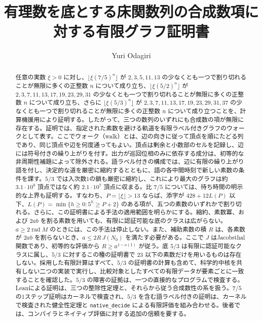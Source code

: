 \documentclass[11pt,reqno]{amsart}
\title[有理数を底とする床関数列の有限グラフ証明書]{有理数を底とする床関数列の合成数項に対する有限グラフ証明書}
\author{Yuri Odagiri}
\date{}
\theoremstyle{definition}
\theoremstyle{definition}
\theoremstyle{remark}
\begin{document}

\begin{abstract}

任意の実数 \(\xi>0\) に対し、\(\lfloor\xi(7/5)^n\rfloor\) が \(2,3,5,11,13\) の少なくとも一つで割り切れることが無限に多くの正整数 \(n\) について成り立ち、\(\lfloor\xi(5/2)^n\rfloor\) が \(2,3,7,11,13,17,19,23,29,31\) の少なくとも一つで割り切れることが無限に多くの正整数 \(n\) について成り立ち、さらに \(\lfloor\xi(5/3)^n\rfloor\) が \(2,3,7,11,13,17,19,23,29,31,37\) の少なくとも一つで割り切れることが無限に多くの正整数 \(n\) について成り立つことを、計算機援用により証明する。したがって、三つの数列のいずれにも合成数の項が無限に存在する。証明では、指定された素数を避ける軌道を有限ラベル付きグラフのウォークとして表す。ここでウォーク（walk）とは、辺の向きに従って頂点を順にたどる列であり、同じ頂点や辺を何度通ってもよい。頂点は剰余と小数部のセルを記録し、辺には符号付きの繰り上がりを付す。出力が巡回位相のみに依存する成分は、初等的な非周期性補題によって除外される。語ラベル付きの構成では、辺に有限の繰り上がり語を付し、決定的な道を厳密に縮約するとともに、語の各中間時刻で新しい素数の条件を課す。\(5/3\) では入次数1の鎖も厳密に縮約し、これにより最大のグラフは約 \(3.1\cdot10^8\) 頂点ではなく約 \(2.1\cdot10^7\) 頂点に収まる。比 \(7/5\) については、待ち時間の明示的な上界も証明する。すなわち、\(P=\lfloor\xi\rfloor>13\) ならば、添字が \(428+12L(P)\) 以下、\(L(P)=\min\{h\ge0:5^h\ge P+2\}\) のある項が、五つの素数のいずれかで割り切れる。さらに、この証明書による手法の適用範囲を明らかにする。縮約、素数冪、および \(2ab\) を割る素数を用いても、有限に認証可能な底のクラスは広がらない。\(a\ge2\operatorname{rad}M\) のときには、この手法は停止しない。また、補助素数の積 \(R\) は、各素数が \(2ab\) を割らないとき、\(a\le2R\,J(N_0)\) を満たす必要がある。ここで \(J\) はJacobsthal関数であり、初等的な評価から \(R\ge a^{1-o(1)}\) が従う。底 \(5/3\) は有限に認証可能なクラスに属し、\(5/3\) に対するこの種の証明書で \(23\) 以下の素数だけを用いるものは存在しない。採用した有限計算はすべて、\(5/3\) の証明書の計算も含めて、科学的中核を共有しない二つの実装で実行し、比較対象としたすべての有限データが要素ごとに一致することを確認した。\(5/3\) の障害の証拠は、一つの直接的なプログラムで検査する。Leanによる証明は、三つの整除性定理と、それらから従う合成数性の系を扱う。\(7/5\) の1ステップ証明はカーネルで検査され、\(5/3\) を含む語ラベル付きの証明は、カーネルで検査された健全性定理と \nolinkurl{native_decide} による有限評価を組み合わせる。後者では、コンパイラとネイティブ評価に対する追加の信頼を要する。

\end{abstract}
\maketitle
\enlargethispage{7pt}
\end{document}
